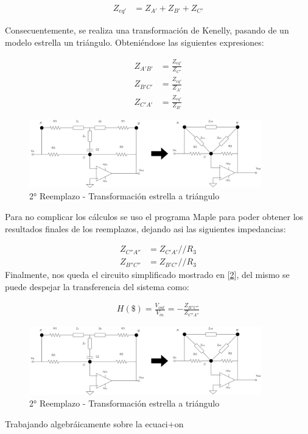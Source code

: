 \begin{align*}
	Z_{eq'} &= Z_{A'} + Z_{B'} + Z_{C'}
\end{align*}

Consecuentemente, se realiza una transformación de Kenelly, pasando 
de un modelo estrella un triángulo. Obteniéndose las siguientes expresiones:

\begin{align}
	Z_{A'B'} &= \frac{Z_{eq'}}{Z_{C'}} \\
	Z_{B'C'} &= \frac{Z_{eq'}}{Z_{A'}}  \\
	Z_{C'A'} &= \frac{Z_{eq'}}{Z_{B'}} 
\end{align}



\begin{figure}[H]
	\centering
	\includegraphics[width=0.9\textwidth]{../Ejercicio4-EcualizadorDeFase/Informe/2cambioTriangulo.png}
	\caption{2° Reemplazo - Transformación estrella a triángulo}
	\label{2reemplazo} 
\end{figure}


Para no complicar los cálculos se uso el programa Maple
 para poder obtener los resultados finales de los reemplazos, 
 dejando asi las siguientes impedancias:

\begin{align}
		Z_{C''A''} & = Z_{C'A'}//R_3 \\
		Z_{B''C''} & = Z_{B'C'}//R_3
\end{align}
Finalmente, nos queda el circuito simplificado mostrado en 
[\ref{circuito_final}], del mismo se puede despejar la transferencia 
del sistema como:

\begin{align}
	H(\$)=\frac{V_{out}}{V_{in}}=-\frac{Z_{B''C''}}{Z_{C''A''}}
	\label{trans}
\end{align}

\begin{figure}[H]
	\centering
	\includegraphics[width=0.9\textwidth]{../Ejercicio4-EcualizadorDeFase/Informe/2cambioTriangulo.png}
	\caption{2° Reemplazo - Transformación estrella a triángulo}
	\label{circuito_final} 
\end{figure}


Trabajando algebráicamente sobre la ecuaci+on






